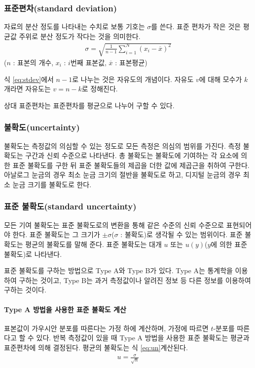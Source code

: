 \documentclass{GSHS-chemexp}
\begin{document}
	\subsubsection{\boldmath 표준편차(standard deviation)}
	자료의 분산 정도를 나타내는 수치로 보통 기호는 $\sigma$를 쓴다.
	표준 편차가 작은 것은 평균값 주위로 분산 정도가 작다는 것을 의미한다.
	\begin{gather}
	\sigma = \sqrt{
		\frac{1}{n-1}\sum_{i=1}^{N}(x_{i}-\overline{x})^{2}
	} \label{eq:stdev}
	\end{gather}
	($n$ : 표본의 개수, $x_{i}$ : $i$번째 표본값,
	$\overline{x}$ : 표본평균)
	
	식 \ref{eq:stdev}에서 $n-1$로 나누는 것은 자유도의 개념이다.
	자유도 $v$에 대해 모수가 $k$개라면 자유도는 $v = n - k$로 정해진다.
	\cite{deg_free}
	
	상대 표준편차는 표준편차를 평균으로 나누어 구할 수 있다.
	
	\subsubsection{불확도(uncertainty)}
	불확도는 측정값의 의심할 수 있는 정도로
	모든 측정은 의심의 범위를 가진다.
	측정 불확도는 구간과 신뢰 수준으로 나타낸다.
	총 불확도는 불확도에 기여하는 각 요소에 의한 표준 불확도를 구한 뒤
	표준 불확도들의 제곱을 더한 값에 제곱근을 취하여 구한다.
	\cite{Stephanie_Bell}
	아날로그 눈금의 경우 최소 눈금 크기의 절반을 불확도로 하고,
	디지털 눈금의 경우 최소 눈금 크기를 불확도로 한다.
	
	\subsubsection{표준 불확도(standard uncertainty)}
	모든 기여 불확도는 표준 불확도로의 변환을 통해 같은 수준의 신뢰 수준으로
	표현되어야 한다. 표준 불확도는 그 크기가 $\pm\sigma$($\sigma$ : 
	불확도)로
	생각될 수 있는 범위이다. 표준 불확도는 평균의 불확도를 말해 준다.
	표준 불확도는 대개 $u$ 또는 $u(y)$($y$에 의한 표준 불확도)로 나타낸다.
	
	표준 불확도를 구하는 방법으로 Type A와 Type B가 있다.
	Type A는 통계학을 이용하여 구하는 것이고,
	Type B는 과거 측정값이나 알려진 정보 등 다른 정보를 이용하여 구하는 
	것이다.
	\cite{Stephanie_Bell}
			
	\paragraph{Type A 방법을 사용한 표준 불확도 계산}
	표본값이 가우시안 분포를 따른다는 가정 하에 계산하며,
	가정에 따르면 $t$-분포를 따른다고 할 수 있다.
	반복 측정값이 있을 때 Type A 방법을 사용한 표준 불확도는
	평균과 표준편차에 의해 결정된다. 평균의 불확도는
	식 \ref{eq:un}\로 계산된다.
	\begin{gather}
	u = \frac{\sigma}{\sqrt{n}} \label{eq:un}
	\end{gather}
	
\end{document}
